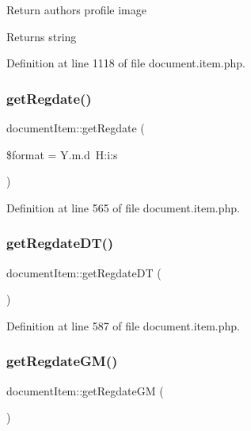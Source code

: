Return author\textquotesingle{}s profile image \begin{DoxyReturn}{Returns}
string 
\end{DoxyReturn}


Definition at line 1118 of file document.\+item.\+php.

\hypertarget{classdocumentItem_a7284bdd7b3fc87941585790f4a1376d7}{}\label{classdocumentItem_a7284bdd7b3fc87941585790f4a1376d7} 
\subsubsection{\texorpdfstring{get\+Regdate()}{getRegdate()}}
{\footnotesize\ttfamily document\+Item\+::get\+Regdate (\begin{DoxyParamCaption}\item[{}]{\$format = {\ttfamily \textquotesingle{}Y.m.d~H\+:i\+:s\textquotesingle{}} }\end{DoxyParamCaption})}



Definition at line 565 of file document.\+item.\+php.

\hypertarget{classdocumentItem_a30f4ec669361717a82e5dee9c9b3868f}{}\label{classdocumentItem_a30f4ec669361717a82e5dee9c9b3868f} 
\subsubsection{\texorpdfstring{get\+Regdate\+D\+T()}{getRegdateDT()}}
{\footnotesize\ttfamily document\+Item\+::get\+Regdate\+DT (\begin{DoxyParamCaption}{ }\end{DoxyParamCaption})}



Definition at line 587 of file document.\+item.\+php.

\hypertarget{classdocumentItem_a7bd6f9adea145314a87c95b13f6e0bd7}{}\label{classdocumentItem_a7bd6f9adea145314a87c95b13f6e0bd7} 
\subsubsection{\texorpdfstring{get\+Regdate\+G\+M()}{getRegdateGM()}}
{\footnotesize\ttfamily document\+Item\+::get\+Regdate\+GM (\begin{DoxyParamCaption}{ }\end{DoxyParamCaption})}




